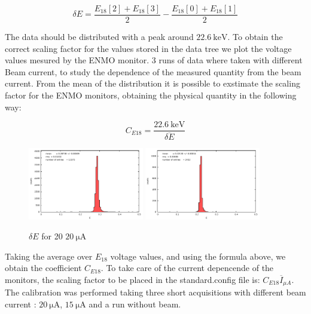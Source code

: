 \begin{equation*}
\delta E = \frac{E_{18}[2] + E_{18}[3]}{2} - \frac{E_{18}[0] + E_{18}[1]}{2} 
\end{equation*}

The data should be distributed with a peak around $\SI{22.6}{\kilo \electronvolt}$. To obtain the correct scaling factor for the values stored in the data tree we plot the voltage values mesured by the ENMO monitor.
3 runs of data where taken with different Beam current, to study the dependence of the measured quantity from the beam current. From the mean of the distribution it is possible to exstimate the scaling factor for the ENMO monitors, obtaining the physical quantity in the following way:

\begin{equation*}
C_{E18} = \frac{\SI{22.6}{\kilo \electronvolt}}{\overline{\delta E}}
\end{equation*}

\begin{figure}[hbtp]
\centering
\includegraphics[width = 0.45\textwidth]{Analysis/ENMOvoltage20.pdf}
\includegraphics[width = 0.45\textwidth]{Analysis/ENMOvoltage15.pdf} 
\caption{$\delta E$ for 20 $\SI{20}{\micro \ampere}$}
\end{figure}

Taking the average over $E_{18}$ voltage values, and using the formula above, we obtain the coefficient $C_{E18}$. To take care of the current depencende of the monitors, the scaling factor to be placed in the standard.config file is: $C_{E18} \overline{I}_{\mu A}$.
The calibration was performed taking three short acquisitions with different beam current : $\SI{20}{\micro \ampere}$, $\SI{15}{\micro \ampere}$ and a run without beam. 

